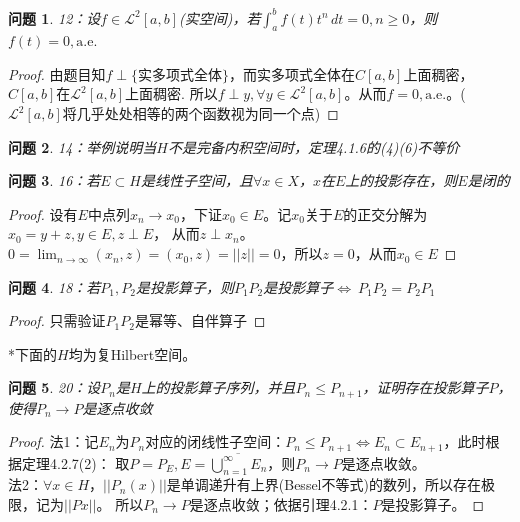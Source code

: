 \documentclass[a4paper, 12pt]{ctexart}
\newtheorem*{theorem}{问题}%
\begin{document}


\begin{theorem}
12：设$f\in\mathscr{L}^2[a,b]$(实空间)，若$\int_a^bf(t)t^n\,dt=0,n\geq0$，则$f(t)=0,\text{a.e.}$
\end{theorem}

\begin{proof}
由题目知$f\perp \{ \text{实多项式全体}\}$，而实多项式全体在$C[a,b]$上面稠密，$C[a,b]$在$\mathscr{L}^2[a,b]$上面稠密.
所以$f\perp y,\forall y \in \mathscr{L}^2[a,b]$。从而$f=0,\text{a.e.}$。($\mathscr{L}^2[a,b]$将几乎处处相等的两个函数视为同一个点)
\end{proof}

\begin{theorem}
14：举例说明当$H$不是完备内积空间时，定理4.1.6的(4)(6)不等价
\end{theorem}


\begin{theorem}
16：若$E \subset H$是线性子空间，且$\forall x\in X$，$x$在$E$上的投影存在，则$E$是闭的
\end{theorem}

\begin{proof}
设有$E$中点列$x_n \to x_0$，下证$x_0 \in E$。记$x_0$关于$E$的正交分解为$x_0=y+z,y\in E,z\perp E$，
从而$z \perp x_n$。$0=\lim_{n\to\infty}(x_n,z)=(x_0,z)=||z||=0$，所以$z=0$，从而$x_0 \in E$
\end{proof}

\begin{theorem}
18：若$P_1,P_2$是投影算子，则$P_1P_2$是投影算子$\iff \ P_1P_2=P_2P_1$
\end{theorem}

\begin{proof}
只需验证$P_1P_2$是幂等、自伴算子
\end{proof}

*下面的$H$均为复Hilbert空间。

\begin{theorem}
20：设$P_n$是$H$上的投影算子序列，并且$P_n \leq P_{n+1}$，证明存在投影算子$P$，使得$P_n\to P$是逐点收敛
\end{theorem}

\begin{proof}
法1：记$E_n$为$P_n$对应的闭线性子空间：$P_n\leq P_{n+1}\iff E_n \subset E_{n+1}$，此时根据定理4.2.7(2)：
取$P=P_E,E=\overline{\bigcup_{n=1}^\infty E_n}$，则$P_n \to P$是逐点收敛。
\\
法2：$\forall x \in H$，$||P_n(x)||$是单调递升有上界(Bessel不等式)的数列，所以存在极限，记为$||Px||$。
所以$P_n \to P$是逐点收敛；依据引理4.2.1：$P$是投影算子。
\end{proof}
\end{document}
